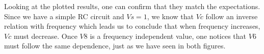 \par Looking at the plotted results, one can confirm that they match the expectations. Since we have a simple RC circuit and $Vs = 1$, we know that $Vc$ follow an inverse relation with frequency which leads us to conclude that when frequency increases, $Vc$ must decrease. Once $V8$ is a frequency independent value, one notices that $V6$ must follow the same dependence, just as we have seen in both figures.

\newpage
